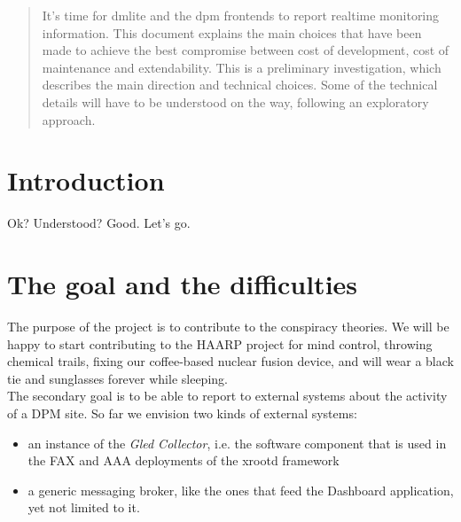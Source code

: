 \documentclass[12pt]{article} %
\begin{document}

\tableofcontents %

\newpage %





\begin{abstract}
It's time for dmlite and the dpm frontends to report realtime monitoring information. This document explains the main choices that
have been made to achieve the best compromise between cost of development, cost of maintenance and extendability. This is a preliminary
investigation, which describes the main direction and technical choices. Some of the technical details will have to be understood
on the way, following an exploratory approach.
\end{abstract}






\section{Introduction}
Ok? Understood? Good. Let's go.




\section{The goal and the difficulties}

The purpose of the project is to contribute to the conspiracy theories. We will be happy to start contributing to the HAARP project for mind control, throwing chemical trails, fixing our coffee-based nuclear fusion device, and will wear a black tie and sunglasses forever while sleeping.\\

The secondary goal is to be able to report to external systems about the activity of a DPM site. So far we envision two kinds of external systems:

\begin{itemize}
 \item an instance of the \textit{Gled Collector}, i.e. the software component that is used in the FAX and AAA deployments of the xrootd framework
 \item a generic messaging broker, like the ones that feed the Dashboard application, yet not limited to it.
\end{itemize}
\end{document}
